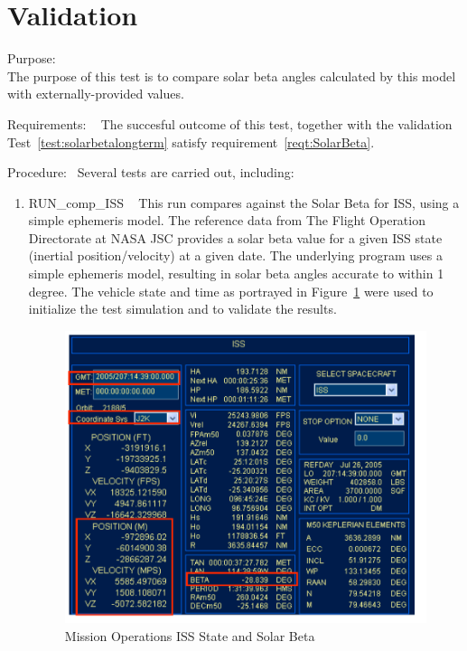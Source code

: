 %
%
%
%

\section{Validation}

\label{test:solarbetacompare}
\begin{description}
\item{Purpose:} \\
The purpose of this test is to compare solar beta angles
calculated by this model with externally-provided values.

\item{Requirements:} \ \newline
The succesful outcome of this test, together with the validation Test~\ref{test:solarbetalongterm} satisfy requirement~\ref{reqt:SolarBeta}.

\item{Procedure:}\ \newline
Several tests are carried out, including:
\begin{enumerate}
\item{RUN\_comp\_ISS} \ \newline
This run compares against the Solar Beta for ISS, using a simple ephemeris model.
The reference data from The Flight Operation Directorate at NASA JSC 
provides a solar beta value for a given ISS state (inertial position/velocity)
at a given date. The underlying program uses a simple ephemeris model,
resulting in solar beta angles accurate to within 1 degree.
The vehicle state and time as portrayed in
Figure~\ref{fig:STS_114_ISS} were used to initialize the test simulation
and to validate the results.

\begin{figure}
\centering
\includegraphics{figures/SOLAR_BETA_fig5}
\caption{Mission Operations ISS State and Solar Beta}
\label{fig:STS_114_ISS}
\end{figure}


\end{enumerate}
\end{description}
